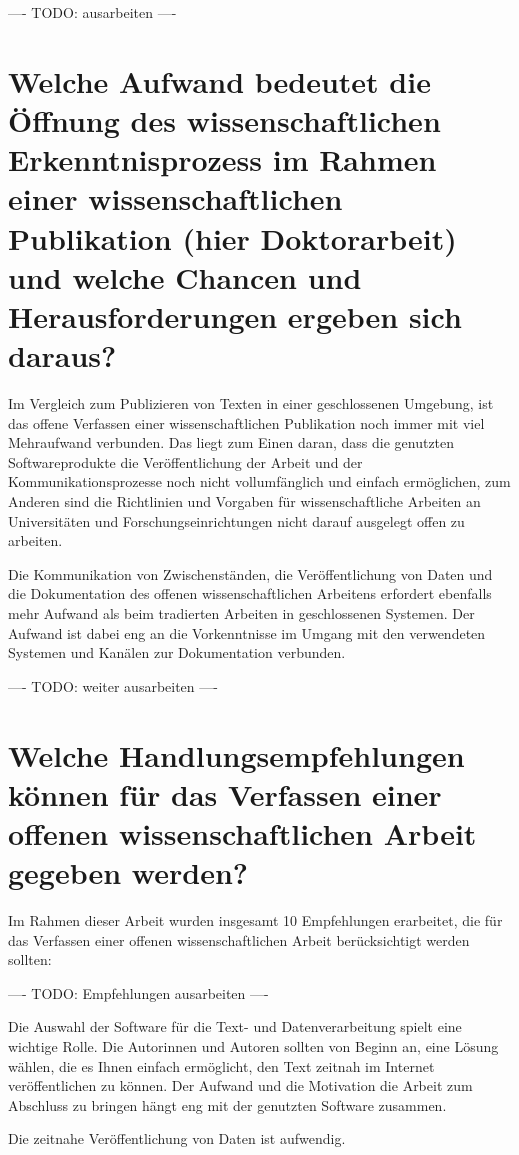 ---- TODO: ausarbeiten ----

\section{Welche Aufwand bedeutet die Öffnung des wissenschaftlichen Erkenntnisprozess im Rahmen einer wissenschaftlichen Publikation (hier Doktorarbeit) und welche Chancen und Herausforderungen ergeben sich daraus?}

Im Vergleich zum Publizieren von Texten in einer geschlossenen Umgebung, ist das offene Verfassen einer wissenschaftlichen Publikation noch immer mit viel Mehraufwand verbunden. Das liegt zum Einen daran, dass die genutzten Softwareprodukte die Veröffentlichung der Arbeit und der Kommunikationsprozesse noch nicht vollumfänglich und einfach ermöglichen, zum Anderen sind die Richtlinien und Vorgaben für wissenschaftliche Arbeiten an Universitäten und Forschungseinrichtungen nicht darauf ausgelegt offen zu arbeiten.

Die Kommunikation von Zwischenständen, die Veröffentlichung von Daten und die Dokumentation des offenen wissenschaftlichen Arbeitens erfordert ebenfalls mehr Aufwand als beim tradierten Arbeiten in geschlossenen Systemen. Der Aufwand ist dabei eng an die Vorkenntnisse im Umgang mit den verwendeten Systemen und Kanälen zur Dokumentation verbunden.

---- TODO: weiter ausarbeiten ----

\section{Welche Handlungsempfehlungen können für das Verfassen einer offenen wissenschaftlichen Arbeit gegeben werden?}

Im Rahmen dieser Arbeit wurden insgesamt 10 Empfehlungen erarbeitet, die für das Verfassen einer offenen wissenschaftlichen Arbeit berücksichtigt werden sollten:

---- TODO: Empfehlungen ausarbeiten ----

Die Auswahl der Software für die Text- und Datenverarbeitung spielt eine wichtige Rolle. Die Autorinnen und Autoren sollten von Beginn an, eine Lösung wählen, die es Ihnen einfach ermöglicht, den Text zeitnah im Internet veröffentlichen zu können. Der Aufwand und die Motivation die Arbeit zum Abschluss zu bringen hängt eng mit der genutzten Software zusammen.

Die zeitnahe Veröffentlichung von Daten ist aufwendig.

